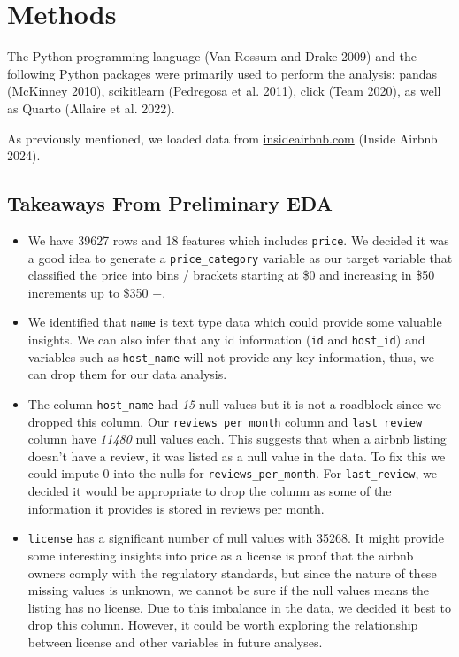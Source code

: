 \documentclass[
  letterpaper,
  DIV=11,
  numbers=noendperiod]{scrartcl}
\begin{document}
\section{Methods}\label{methods}

The Python programming language (Van Rossum and Drake 2009) and the
following Python packages were primarily used to perform the analysis:
pandas (McKinney 2010), scikitlearn (Pedregosa et al. 2011), click (Team
2020), as well as Quarto (Allaire et al. 2022).

As previously mentioned, we loaded data from
\href{http://insideairbnb.com/new-york-city/}{insideairbnb.com} (Inside
Airbnb 2024).

\subsection{Takeaways From Preliminary
EDA}\label{takeaways-from-preliminary-eda}

\begin{itemize}
\item
  We have 39627 rows and 18 features which includes \texttt{price}. We
  decided it was a good idea to generate a \texttt{price\_category}
  variable as our target variable that classified the price into bins /
  brackets starting at \$0 and increasing in \$50 increments up to \$350
  +.
\item
  We identified that \texttt{name} is text type data which could provide
  some valuable insights. We can also infer that any id information
  (\texttt{id} and \texttt{host\_id}) and variables such as
  \texttt{host\_name} will not provide any key information, thus, we can
  drop them for our data analysis.
\item
  The column \texttt{host\_name} had \emph{15} null values but it is not
  a roadblock since we dropped this column. Our
  \texttt{reviews\_per\_month} column and \texttt{last\_review} column
  have \emph{11480} null values each. This suggests that when a airbnb
  listing doesn't have a review, it was listed as a null value in the
  data. To fix this we could impute 0 into the nulls for
  \texttt{reviews\_per\_month}. For \texttt{last\_review}, we decided it
  would be appropriate to drop the column as some of the information it
  provides is stored in reviews per month.
\item
  \texttt{license} has a significant number of null values with 35268.
  It might provide some interesting insights into price as a license is
  proof that the airbnb owners comply with the regulatory standards, but
  since the nature of these missing values is unknown, we cannot be sure
  if the null values means the listing has no license. Due to this
  imbalance in the data, we decided it best to drop this column.
  However, it could be worth exploring the relationship between license
  and other variables in future analyses.
\end{itemize}
\end{document}
